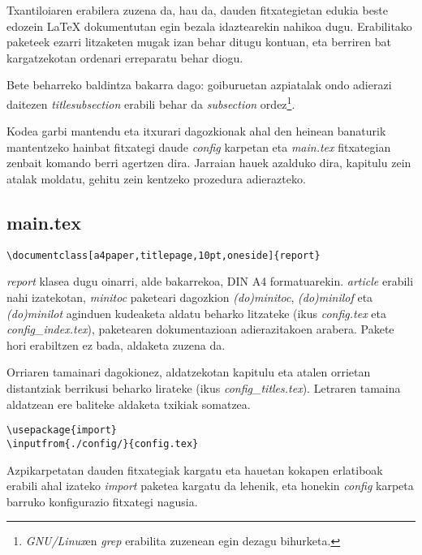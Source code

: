 %

Txantiloiaren erabilera zuzena da, hau da, dauden fitxategietan edukia beste edozein \LaTeX{} dokumentutan egin bezala idaztearekin nahikoa dugu. Erabilitako paketeek ezarri litzaketen mugak izan behar ditugu kontuan, eta berriren bat kargatzekotan ordenari erreparatu behar diogu.

Bete beharreko baldintza bakarra dago: goiburuetan azpiatalak ondo adierazi daitezen \emph{titlesubsection} erabili behar da \emph{subsection} ordez\footnote{\emph{GNU/Linux}en \emph{grep} erabilita zuzenean egin dezagu bihurketa.}.

Kodea garbi mantendu eta itxurari dagozkionak ahal den heinean banaturik mantentzeko hainbat fitxategi daude \emph{config} karpetan eta \emph{main.tex} fitxategian zenbait komando berri agertzen dira. Jarraian hauek azalduko dira, kapitulu zein atalak moldatu, gehitu zein kentzeko prozedura adierazteko.

\subsection*{main.tex}

\begin{verbatim}
\documentclass[a4paper,titlepage,10pt,oneside]{report}
\end{verbatim}

\emph{report} klasea dugu oinarri, alde bakarrekoa, DIN A4 formatuarekin. \emph{article} erabili nahi izatekotan, \emph{minitoc} paketeari dagozkion \emph{(do)minitoc}, \emph{(do)minilof} eta \emph{(do)minilot} aginduen kudeaketa aldatu beharko litzateke (ikus \emph{config.tex} eta \emph{config\_index.tex}), paketearen dokumentazioan adierazitakoen arabera. Pakete hori erabiltzen ez bada, aldaketa zuzena da.

Orriaren tamainari dagokionez, aldatzekotan kapitulu eta atalen orrietan distantziak berrikusi beharko lirateke (ikus \emph{config\_titles.tex}). Letraren tamaina aldatzean ere baliteke aldaketa txikiak somatzea.

\begin{verbatim}
\usepackage{import}
\inputfrom{./config/}{config.tex}
\end{verbatim}

Azpikarpetatan dauden fitxategiak kargatu eta hauetan kokapen erlatiboak erabili ahal izateko \emph{import} paketea kargatu da lehenik, eta honekin \emph{config} karpeta barruko konfigurazio fitxategi nagusia.

